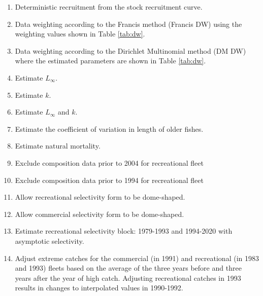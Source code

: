 \documentclass[11pt,
  english,
  letterpaper,
]{article}
\begin{document}
\begin{enumerate}
   
  \item Deterministic recruitment from the stock recruitment curve. 

  \item Data weighting according to the Francis method (Francis DW) using the weighting values shown in Table \ref{tab:dw}. 
  
  \item Data weighting according to the Dirichlet Multinomial method (DM DW) where the estimated parameters are shown in Table \ref{tab:dw}. 

  \item Estimate $L_{\infty}$.
  
  \item Estimate $k$.
  
  \item Estimate $L_{\infty}$ and $k$.

  \item Estimate the coefficient of variation in length of older fishes.

  \item Estimate natural mortality.
  
  \item Exclude composition data prior to 2004 for recreational fleet
  
  \item Exclude composition data prior to 1994 for recreational fleet

  \item Allow recreational selectivity form to be dome-shaped. 
  
  \item Allow commercial selectivity form to be dome-shaped.
  
  \item Estimate recreational selectivity block: 1979-1993 and 1994-2020 with asymptotic selectivity.  

  \item Adjust extreme catches for the commercial (in 1991) and recreational (in 1983 and 1993) fleets based on the average of the three years before and three years after the year of high catch. Adjusting recreational catches in 1993 results in changes to interpolated values in 1990-1992.     
  
\end{enumerate}

\end{document}
